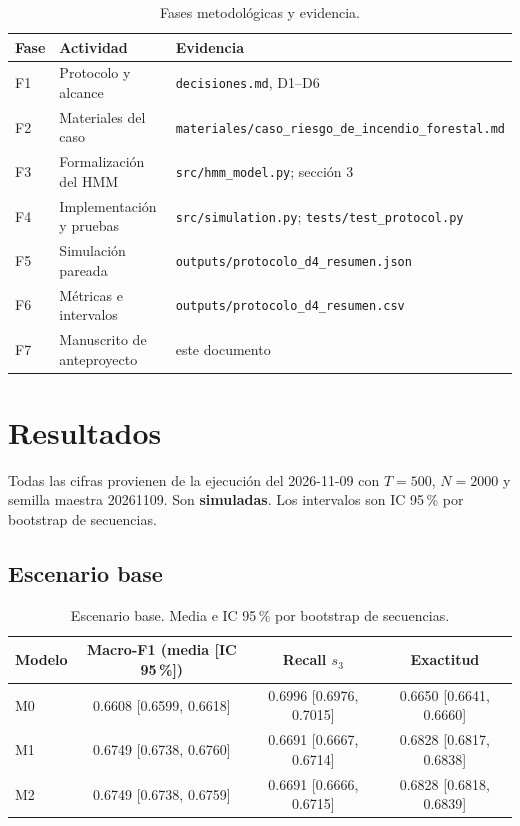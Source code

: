 \documentclass[11pt,a4paper]{article}
\begin{document}
\begin{table}[H]
\centering
\caption{Fases metodológicas y evidencia.}
\begin{tabularx}{\textwidth}{@{}l>{\raggedright\arraybackslash}X>{\raggedright\arraybackslash}X@{}}
\toprule
Fase & Actividad & Evidencia\\
\midrule
F1 & Protocolo y alcance & \texttt{decisiones.md}, D1--D6\\
F2 & Materiales del caso & \texttt{materiales/caso\_riesgo\_de\_\allowbreak incendio\_forestal.md}\\
F3 & Formalización del HMM & \texttt{src/hmm\_model.py}; sección 3\\
F4 & Implementación y pruebas & \texttt{src/simulation.py}; \texttt{tests/test\_protocol.py}\\
F5 & Simulación pareada & \texttt{outputs/protocolo\_d4\_resumen.json}\\
F6 & Métricas e intervalos & \texttt{outputs/protocolo\_d4\_resumen.csv}\\
F7 & Manuscrito de anteproyecto & este documento\\
\bottomrule
\end{tabularx}
\end{table}

\section{Resultados}

Todas las cifras provienen de la ejecución del 2026-11-09 con \(T=500\), \(N=2000\) y semilla maestra 20261109. Son \textbf{simuladas}. Los intervalos son IC 95\,\% por bootstrap de secuencias.

\subsection{Escenario base}

\begin{table}[H]
\centering
\caption{Escenario base. Media e IC 95\,\% por bootstrap de secuencias.}
\begin{tabular}{lccc}
\toprule
Modelo & Macro-F1 (media [IC 95\,\%]) & Recall \(s_3\) & Exactitud\\
\midrule
M0 & 0.6608 [0.6599, 0.6618] & 0.6996 [0.6976, 0.7015] & 0.6650 [0.6641, 0.6660]\\
M1 & 0.6749 [0.6738, 0.6760] & 0.6691 [0.6667, 0.6714] & 0.6828 [0.6817, 0.6838]\\
M2 & 0.6749 [0.6738, 0.6759] & 0.6691 [0.6666, 0.6715] & 0.6828 [0.6818, 0.6839]\\
\bottomrule
\end{tabular}
\end{table}
\end{document}
